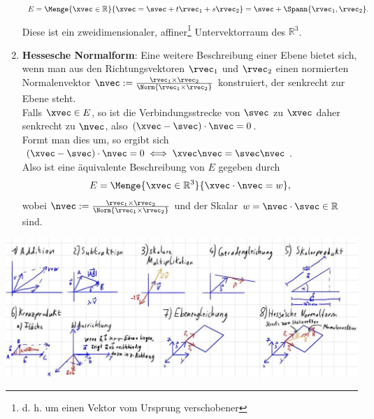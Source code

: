 \begin{Beispiel}
\begin{enumerate}
    \begin{equation*}
         E=\Menge{\xvec\in\mathbb{R}}{\xvec=\svec+t\rvec_1+s\rvec_2}=\svec+\Spann{\rvec_1,\rvec_2}.
    \end{equation*}
    Diese ist ein zweidimensionaler, affiner\footnote{d. h. um einen Vektor vom Ursprung verschobener} Untervektorraum des $\mathbb{R}^3$.
    \item \textbf{Hessesche Normalform}:
    Eine weitere Beschreibung einer Ebene bietet sich, wenn man aus den Richtungsvektoren $\rvec_1$ und $\rvec_2$ einen normierten Normalenvektor $\nvec:=\frac{\rvec_1\times\rvec_2}{\Norm{\rvec_1\times\rvec_2}}$ konstruiert, der senkrecht zur Ebene steht.\\
    Falls $\xvec\in E$, so ist die Verbindungsstrecke von $\svec$ zu $\xvec$ daher senkrecht zu $\nvec$, also $(\xvec-\svec)\cdot \nvec=0$.\\
    Formt man dies um, so ergibt sich $(\xvec-\svec)\cdot \nvec=0\iff \xvec\nvec=\svec\nvec$.\\
    Also ist eine äquivalente Beschreibung von $E$ gegeben durch
    \begin{equation*}
        E=\Menge{\xvec\in\mathbb{R}^3}{\xvec\cdot \nvec=w},
    \end{equation*}
    wobei $\nvec:=\frac{\rvec_1\times\rvec_2}{\Norm{\rvec_1\times\rvec_2}}$ und der Skalar $w=\nvec\cdot\svec\in\mathbb{R}$ sind.
\end{enumerate}
\begin{center}
    \includegraphics[width=.9\textwidth]{Dateien/07/07Vektoranschauungen.jpg}
\end{center}
\end{Beispiel}
